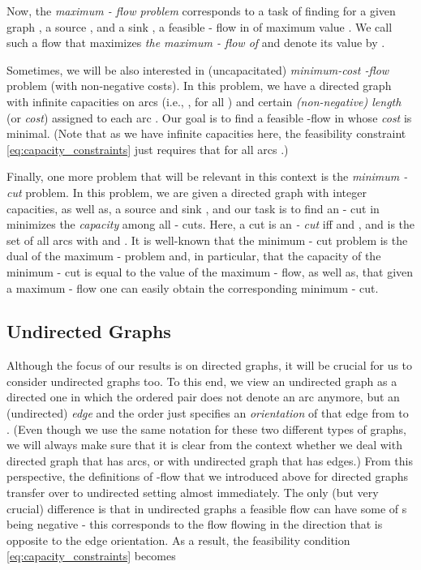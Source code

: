\documentclass[11pt, letterpaper]{article}
\begin{document}
Now, the {\em maximum - flow problem} corresponds to a task of finding for a given graph , a source , and a sink , a feasible - flow  in  of maximum value . We call such a flow  that maximizes  {\em the maximum - flow of } and denote its value by .

Sometimes, we will be also interested in (uncapacitated) {\em minimum-cost -flow} problem (with non-negative costs). In this problem, we have a directed graph  with infinite capacities on arcs (i.e., , for all ) and certain {\em (non-negative) length} (or {\em cost})  assigned to each arc . Our goal is to find a feasible -flow  in  whose {\em cost } is minimal. (Note that as we have infinite capacities here, the feasibility constraint \eqref{eq:capacity_constraints} just requires that  for all arcs .)

Finally, one more problem that will be relevant in this context is the {\em minimum - cut} problem. In this problem, we are given a directed graph  with integer capacities, as well as, a source  and sink , and our task is to find an - cut  in   minimizes the {\em capacity } among all - cuts. Here, a cut  is an {\em - cut} iff  and , and   is the set of all arcs  with  and . It is well-known \cite{EliasFS56,FordF56} that the minimum - cut problem is the dual of the maximum - problem and, in particular, that the capacity of the minimum - cut is equal to the value of the maximum - flow, as well as, that given a maximum - flow one can easily obtain the corresponding minimum - cut. 

\subsection{Undirected Graphs}

Although the focus of our results is on directed graphs, it will be crucial for us to consider undirected graphs too. To this end, we view an undirected graph  as a directed one in which the ordered pair  does not denote an arc anymore, but an (undirected) {\em edge}  and the order just specifies an {\em orientation} of that edge from  to . (Even though we use the same notation for these two different types of graphs, we will always make sure that it is clear from the context whether we deal with directed graph that has arcs, or with undirected graph that has edges.) From this perspective, the definitions of -flow  that we introduced above for directed graphs transfer over to undirected setting almost immediately. The only (but very crucial) difference  is that in undirected graphs a feasible flow can have some of s being negative - this corresponds to the flow flowing in the direction that is opposite to the edge orientation. As a result, the feasibility condition \eqref{eq:capacity_constraints} becomes 
 
\end{document}
